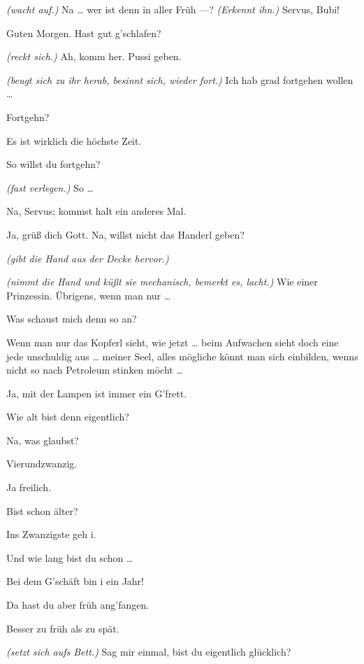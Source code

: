 \documentclass[
	final,
	a4paper,
	ngerman,
	mpinclude = true, %
	twoside = true,
	open = right,
	cleardoublepage = plain,
	DIV = 13,
	BCOR = 1cm,
	titlepage = firstiscover,
	]{scrbook}
\newcommand{\direction}[1]{\textit{(#1)}}
\newcommand{\thecharacter}[1]{\textup{\textsc{#1}}\xspace}
\newcommand{\thenutte}{\thecharacter{Leocadia}}
\newcommand{\theentrepeneurin}{\thecharacter{Katerina Albrecht}}
\newcommand{\character}[1]{\item[#1:]}
\newcommand{\nutte}{\character{\thenutte}}
\newcommand{\entrepeneurin}{\character{\theentrepeneurin}}
\begin{document}
\begin{play}
	\nutte
	\direction{wacht auf.} Na \ldots{} wer ist denn in aller Früh ---? \direction{Erkennt ihn.} Servus, Bubi!

	\entrepeneurin
	Guten Morgen. Hast gut g'schlafen?

	\nutte
	\direction{reckt sich.} Ah, komm her. Pussi geben.

	\entrepeneurin
	\direction{beugt sich zu ihr herab, besinnt sich, wieder fort.} Ich hab grad fortgehen wollen \ldots{}

	\nutte
	Fortgehn?

	\entrepeneurin
	Es ist wirklich die höchste Zeit.

	\nutte
	So willst du fortgehn?

	\entrepeneurin
	\direction{fast verlegen.} So \ldots{}

	\nutte
	Na, Servus; kommst halt ein anderes Mal.

	\entrepeneurin
	Ja, grüß dich Gott. Na, willst nicht das Handerl geben?

	\nutte
	\direction{gibt die Hand aus der Decke hervor.}

	\entrepeneurin
	\direction{nimmt die Hand und küßt sie mechanisch, bemerkt es, lacht.} Wie einer Prinzessin. Übrigens, wenn man nur \ldots{}

	\nutte
	Was schaust mich denn so an?

	\entrepeneurin
	Wenn man nur das Kopferl sieht, wie jetzt \ldots{} beim Aufwachen sieht doch eine jede unschuldig aus \ldots{} meiner Seel, alles mögliche könnt man sich einbilden, wenns nicht so nach Petroleum stinken möcht \ldots{}

	\nutte
	Ja, mit der Lampen ist immer ein G'frett.

	\entrepeneurin
	Wie alt bist denn eigentlich?

	\nutte
	Na, was glaubst?

	\entrepeneurin
	Vierundzwanzig.

	\nutte
	Ja freilich.

	\entrepeneurin
	Bist schon älter?

	\nutte
	Ins Zwanzigste geh i.

	\entrepeneurin
	Und wie lang bist du schon \ldots{}

	\nutte
	Bei dem G'schäft bin i ein Jahr!

	\entrepeneurin
	Da hast du aber früh ang'fangen.

	\nutte
	Besser zu früh als zu spät.

	\entrepeneurin
	\direction{setzt sich aufs Bett.} Sag mir einmal, bist du eigentlich glücklich?


\end{play}
\end{document}
